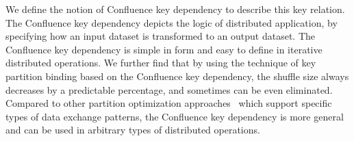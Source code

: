\documentclass[10pt,journal,compsoc]{IEEEtran}
\begin{document}
We define the notion of Confluence key dependency to describe this key relation.
The Confluence key dependency depicts the logic of distributed application, by specifying how an input dataset is transformed 
to an output dataset. 
The Confluence key dependency is simple in form and easy to define in iterative distributed operations.
We further find that by using the technique of key partition binding 
based on the Confluence key dependency, the shuffle size 
always decreases by a predictable percentage, 
and sometimes can be even eliminated.
Compared to other partition optimization approaches~\cite{zhou2010scope, zhang2012shuffle} 
which support specific types of data exchange patterns, 
the Confluence key dependency 
is more general and can be used in arbitrary types of distributed operations.
\end{document}
